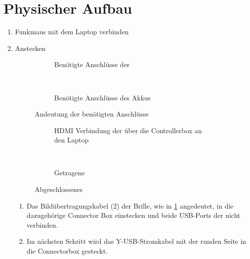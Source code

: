 \section{Physischer Aufbau}
\begin{enumerate}
	\item Funkmaus mit dem Laptop verbinden
	\item \meta Anstecken
	\begin{figure}[t]
		\centering
		\begin{subfigure}[t]{0.45\textwidth}
			\centering
			\caption{Benötigte Anschlüsse der \meta}
			\label{fig:install_box}
		\end{subfigure}
		~
		\begin{subfigure}[t]{0.45\textwidth}
			\centering
			\caption{Benötigte Anschlüsse des Akkus}
			\label{fig:install_akku}
		\end{subfigure}
		\caption{Andeutung der benötigten Anschlüsse}
		\label{fig:install_power}
	\end{figure}
	\begin{figure}[t]
		\centering
		\begin{subfigure}[t]{0.45\textwidth}
			\centering
			\caption{HDMI Verbindung der \meta über die Controllerbox an den Laptop}
			\label{fig:install_hdmi}
		\end{subfigure}
		~
		\begin{subfigure}[t]{0.45\textwidth}
			\centering
			\caption{Getragene \meta}
			\label{fig:install_meta}
		\end{subfigure}
		\caption{Abgeschlossenes \setup}
		\label{fig:install_setup}
	\end{figure}
	\begin{enumerate}
		\item Das Bildübertragungskabel (2) der \meta Brille, wie in \cref{fig:install_box} angedeutet, in die dazugehörige Connector Box einstecken und beide USB-Ports der \meta nicht verbinden.
		\item Im nächsten Schritt wird das Y-USB-Stromkabel mit der runden Seite in die Connectorbox gesteckt.

\end{enumerate}
\end{enumerate}
